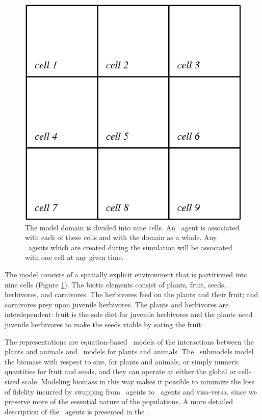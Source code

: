 \begin{figure}
\begin{center}
  \includegraphics{Figure2}
  \caption{The model domain is divided into nine cells. An \SD\ agent
    is associated with each of these cells and with the domain as a
    whole. Any \IB\ agents which are created during the simulation
    will be associated with one cell at any given time.}
  \label{domain}
\end{center}
\end{figure}


The model consists of a spatially explicit environment that is
partitioned into nine cells (Figure \ref{domain}). The biotic elements
consist of plants, fruit, seeds, herbivores, and carnivores.  The
herbivores feed on the plants and their fruit; and carnivores prey
upon juvenile herbivores.  The plants and herbivores are
interdependent: fruit is the sole diet for juvenile herbivores and the
plants need juvenile herbivores to make the seeds viable by eating the
fruit.

The rep\-re\-sen\-ta\-tions are equation-based \SD\ models of the interactions
between the plants and animals and \IB\ models for plants and
animals. The \SD\ sub\-models model the biomass with respect
to size, for plants and animals, or simply numeric quantities for
fruit and seeds, and they can operate at either the global or
cell-sized scale. Modeling biomass in this way makes it possible to
minimize the loss of fidelity incurred by swapping from \IB\ agents to
\SD\ agents and visa-versa, since we preserve more of the essential
nature of the populations. A more detailed description of the
\SD\ agents is presented in the \SuppMaterial.

